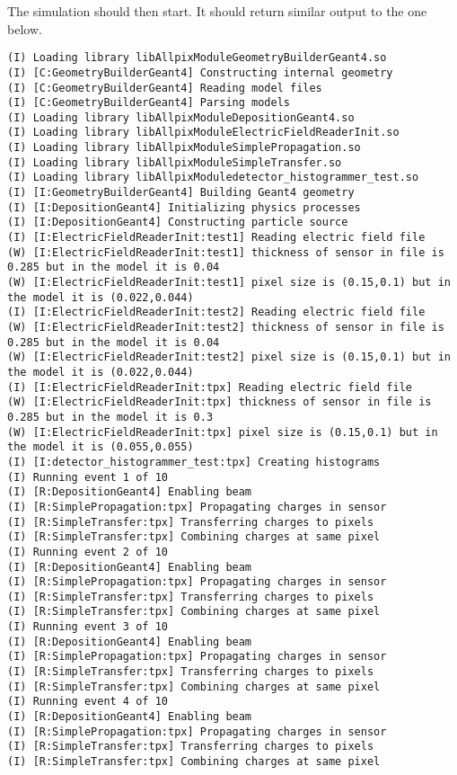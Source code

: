 The simulation should then start. It should return similar output to the one below.
\begin{lstlisting}[breaklines]
(I) Loading library libAllpixModuleGeometryBuilderGeant4.so
(I) [C:GeometryBuilderGeant4] Constructing internal geometry
(I) [C:GeometryBuilderGeant4] Reading model files
(I) [C:GeometryBuilderGeant4] Parsing models
(I) Loading library libAllpixModuleDepositionGeant4.so
(I) Loading library libAllpixModuleElectricFieldReaderInit.so
(I) Loading library libAllpixModuleSimplePropagation.so
(I) Loading library libAllpixModuleSimpleTransfer.so
(I) Loading library libAllpixModuledetector_histogrammer_test.so
(I) [I:GeometryBuilderGeant4] Building Geant4 geometry
(I) [I:DepositionGeant4] Initializing physics processes
(I) [I:DepositionGeant4] Constructing particle source
(I) [I:ElectricFieldReaderInit:test1] Reading electric field file
(W) [I:ElectricFieldReaderInit:test1] thickness of sensor in file is 0.285 but in the model it is 0.04
(W) [I:ElectricFieldReaderInit:test1] pixel size is (0.15,0.1) but in the model it is (0.022,0.044)
(I) [I:ElectricFieldReaderInit:test2] Reading electric field file
(W) [I:ElectricFieldReaderInit:test2] thickness of sensor in file is 0.285 but in the model it is 0.04
(W) [I:ElectricFieldReaderInit:test2] pixel size is (0.15,0.1) but in the model it is (0.022,0.044)
(I) [I:ElectricFieldReaderInit:tpx] Reading electric field file
(W) [I:ElectricFieldReaderInit:tpx] thickness of sensor in file is 0.285 but in the model it is 0.3
(W) [I:ElectricFieldReaderInit:tpx] pixel size is (0.15,0.1) but in the model it is (0.055,0.055)
(I) [I:detector_histogrammer_test:tpx] Creating histograms
(I) Running event 1 of 10
(I) [R:DepositionGeant4] Enabling beam
(I) [R:SimplePropagation:tpx] Propagating charges in sensor
(I) [R:SimpleTransfer:tpx] Transferring charges to pixels
(I) [R:SimpleTransfer:tpx] Combining charges at same pixel
(I) Running event 2 of 10
(I) [R:DepositionGeant4] Enabling beam
(I) [R:SimplePropagation:tpx] Propagating charges in sensor
(I) [R:SimpleTransfer:tpx] Transferring charges to pixels
(I) [R:SimpleTransfer:tpx] Combining charges at same pixel
(I) Running event 3 of 10
(I) [R:DepositionGeant4] Enabling beam
(I) [R:SimplePropagation:tpx] Propagating charges in sensor
(I) [R:SimpleTransfer:tpx] Transferring charges to pixels
(I) [R:SimpleTransfer:tpx] Combining charges at same pixel
(I) Running event 4 of 10
(I) [R:DepositionGeant4] Enabling beam
(I) [R:SimplePropagation:tpx] Propagating charges in sensor
(I) [R:SimpleTransfer:tpx] Transferring charges to pixels
(I) [R:SimpleTransfer:tpx] Combining charges at same pixel

\end{lstlisting}
